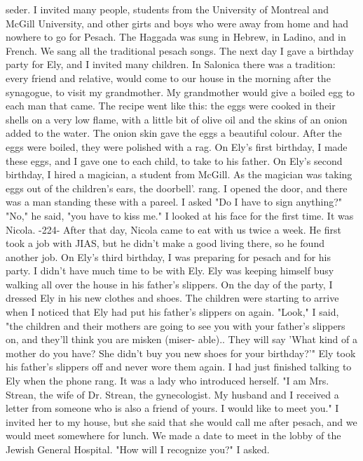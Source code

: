 seder. I invited many people, students from the University of Montreal and McGill University, and other girts and boys who were away from home and had nowhere to go for Pesach. The Haggada was sung in Hebrew, 
in Ladino, and in French. We sang all the traditional pesach songs. 
The next day I gave a birthday party for Ely, and I invited many 
children. In Salonica there was a tradition: every friend and relative, 
would come to our house in the morning after the synagogue, to visit 
my grandmother. My grandmother would give a boiled egg to each man that 
came. The recipe went like this: the eggs were cooked in their shells 
on a very low flame, with a little bit of olive oil and the skins of 
an onion added to the water. The onion skin gave the eggs a beautiful 
colour. After the eggs were boiled, they were polished with a rag. On 
Ely's first birthday, I made these eggs, and I gave one to each child, to 
take to his father. 
On Ely's second birthday, I hired a magician, a student from McGill. 
As the magician was taking eggs out of the children's ears, the doorbell'. 
rang. I opened the door, and there was a man standing these with a pareel. I asked "Do I have to sign anything?" 
"No," he said, "you have to kiss me." I looked at his face for the 
first time. It was Nicola. 
-224- 
After that day, Nicola came to eat with us twice a week. He 
first took a job with JIAS, but he didn't make a good living there, 
so he found another job. 
On Ely's third birthday, I was preparing for pesach and for his 
party. I didn't have much time to be with Ely. Ely was keeping himself 
busy walking all over the house in his father's slippers. On the day of 
the party, I dressed Ely in his new clothes and shoes. The children were 
starting to arrive when I noticed that Ely had put his father's slippers 
on again. 
"Look," I said, "the children and their mothers are going to see you 
with your father's slippers on, and they'll think you are misken (miser-
able).. They will say 'What kind of a mother do you have? She didn't 
buy you new shoes for your birthday?'" Ely took his father's slippers 
off and never wore them again. 
I had just finished talking to Ely when the phone rang. It was a 
lady who introduced herself. "I am Mrs. Strean, the wife of Dr. Strean, 
the gynecologist. My husband and I received a letter from someone who 
is also a friend of yours. I would like to meet you." I invited her to 
my house, but she said that she would call me after pesach, and we would 
meet somewhere for lunch. We made a date to meet in the lobby of the 
Jewish General Hospital. 
"How will I recognize you?" I asked. 
